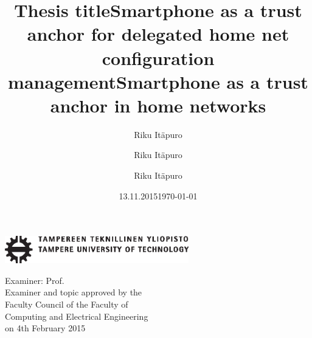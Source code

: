 \documentclass[12pt,a4paper,english]{tutthesis}
\author{Riku Itäpuro}
\title{Thesis title}      %
\author{Riku Itäpuro}
\title{Smartphone as a trust anchor for delegated home net configuration management}
\author{Riku Itäpuro}
\date{13.11.2015}
\title{Smartphone as a trust anchor in home networks}
\begin{document}
\maketitle




\newpage             %

 \pagestyle{headings}
 \thispagestyle{empty}
\date\today
 \vspace*{-.5cm}\noindent
 \includegraphics[width=8cm]{tty_tut_logo}   %

\vspace{6.8cm}
\maketitle
\vspace{6.7cm} %

\begin{flushright}  
  \begin{minipage}[c]{6.8cm}
    \begin{spacing}{1.0}
      \textsf{Examiner: Prof. \@examiner}\\
      \textsf{Examiner and topic approved by the}\\ 
      \textsf{Faculty Council of the Faculty of} \\
      \textsf{Computing and Electrical Engineering} \\
      \textsf{on 4th February 2015}\\
    \end{spacing}
  \end{minipage}
\end{flushright}
\end{document}
